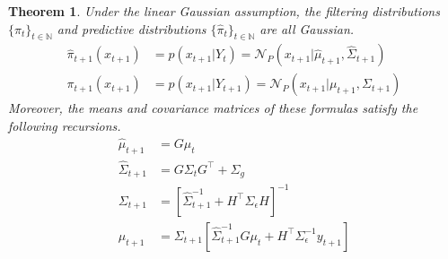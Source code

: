 \documentclass[12pt]{article}
\newtheorem{thm}{Theorem}
\begin{document}
\begin{thm}
Under the linear Gaussian assumption, the filtering distributions $\{\pi_t\}_{t \in \mathbb{N}}$ and predictive distributions $\{\hat{\pi}_{t}\}_{t \in \mathbb{N}}$ are all 
Gaussian. 
\begin{align*}
\hat{\pi}_{t+1}(x_{t+1}) &= p(x_{t+1}|Y_{t}) = \mathcal{N}_P(x_{t+1}|\hat{\mu}_{t+1}, \hat{\Sigma}_{t+1}) \\
\pi_{t+1}(x_{t+1}) &= p(x_{t+1}|Y_{t+1}) = \mathcal{N}_P(x_{t+1}|\mu_{t+1}, \Sigma_{t+1})
\end{align*}
Moreover, the means and covariance matrices of these formulas satisfy the following recursions. 
\begin{align*}
\hat{\mu}_{t + 1} &= G \mu_{t} \\
\hat{\Sigma}_{t + 1} &= G \Sigma_t G^\top + \Sigma_g \\
\Sigma_{t + 1} &= \left[\hat{\Sigma}^{-1}_{t + 1} + H^\top \Sigma_{\epsilon} H \right]^{-1} \\
\mu_{t + 1} &= \Sigma_{t + 1} \left[\hat{\Sigma}^{-1}_{t + 1}G \mu_t + H^\top \Sigma_{\epsilon}^{-1} y_{t+1} \right] 
\end{align*}
\end{thm}
\end{document}
